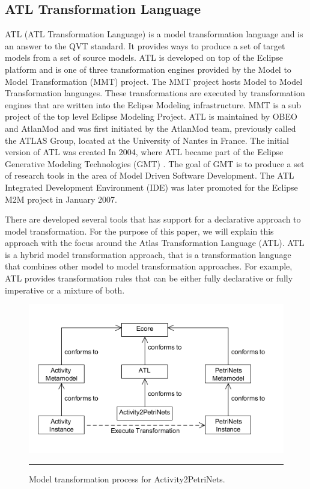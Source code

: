 \subsection{ATL Transformation Language}

ATL\cite{ATL} (ATL Transformation Language) is a model transformation
language and is an answer to the QVT\cite{QVT} standard. It
provides ways to produce a set of target models from a set of source models.
ATL is developed on top of the Eclipse platform and is one of three
transformation engines provided by the Model to Model Transformation (MMT)
project\cite{MMT}. The MMT project hosts Model to Model Transformation
languages. These transformations are executed by transformation engines that are
written into the Eclipse Modeling infrastructure. MMT is a sub project of the
top level Eclipse Modeling Project\cite{EMP}. ATL is maintained by
OBEO\cite{OBEO} and AtlanMod\cite{ATLANMod} and was first initiated by the
AtlanMod team, previously called the ATLAS Group, located at the University of
Nantes in France. The initial version of ATL was created In 2004, where ATL
became part of the Eclipse Generative Modeling Technologies (GMT) \cite{GMT}.
The goal of GMT is to produce a set of research tools in the area of Model
Driven Software Development. The ATL Integrated Development Environment (IDE)
was later promoted for the Eclipse M2M project in January 2007.

There are developed several tools that has support for a declarative
approach to model transformation. For the purpose of this paper, we will explain
this approach with the focus around the Atlas Transformation Language (ATL).
ATL is a hybrid model transformation approach, that is a transformation
language that combines other model to model transformation approaches. For
example, ATL provides transformation rules that can be either fully declarative
or fully imperative or a mixture of both. 

\begin{figure}[H]
	\centering
	\includegraphics[scale=0.55]{figures/ATL.png}
	\rule{35em}{0.5pt}
	\caption[Model transformation for Atlas transformation language]
	{Model transformation process for Activity2PetriNets.}
	\label{fig:ATL}
\end{figure}

